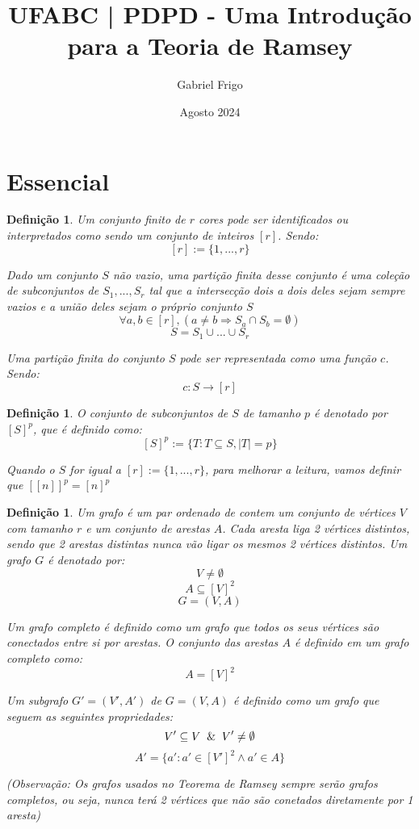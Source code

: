 \documentclass{article}
\title{UFABC | PDPD - Uma Introdução para a Teoria de Ramsey}
\author{Gabriel Frigo}
\date{Agosto 2024}
\newtheorem{defi}[teor]{Definição}
\begin{document}
\maketitle


\section{Essencial}


\begin{defi}
    \label{finite_partition_c}
    Um \emph{conjunto finito de $r$ cores} pode ser identificados ou interpretados como sendo um conjunto de inteiros $[r]$. Sendo:
    \[[r]:=\{1, ..., r\}\]

    Dado um conjunto $S$ não vazio, uma partição finita desse conjunto é uma coleção de subconjuntos de $S_1, ..., S_r$ tal que a intersecção dois a dois deles sejam sempre vazios e a união deles sejam o próprio conjunto $S$
    \[\forall{a,b} \in [r], (a \neq b \Rightarrow S_a \cap S_b = \emptyset)\]
    \[S = S_1 \cup ... \cup S_r \]

    Uma \emph{partição finita do conjunto $S$} pode ser representada como uma função $c$. Sendo:
    \[c:S\rightarrow[r]\]
\end{defi}

\begin{defi}
    \label{subset_p}
    O \emph{conjunto de subconjuntos de $S$ de tamanho $p$} é denotado por $[S]^p$, que é definido como:
    \[[S]^p:=\{T: T \subseteq S, |T| = p\}\]

    Quando o $S$ for igual a $[r]:=\{1, ..., r\}$, para melhorar a leitura, vamos definir que $[[n]]^p = [n]^p$
\end{defi}

\begin{defi}
    \label{graph_g}
    Um \emph{grafo} é um par ordenado de contem um conjunto de vértices $V$ com tamanho $r$ e um conjunto de arestas $A$. Cada aresta liga 2 vértices distintos, sendo que 2 arestas distintas nunca vão ligar os mesmos 2 vértices distintos. Um grafo $G$ é denotado por:
    \[V \neq \emptyset\]
    \[A \subseteq [V]^2\]
    \[G = (V, A)\]

    Um \emph{grafo completo} é definido como um grafo que todos os seus vértices são conectados entre si por arestas. O conjunto das arestas $A$ é definido em um grafo completo como:
    \[A = [V]^2\]

    Um \emph{subgrafo} $G' = (V', A')$ de $G = (V, A)$ é definido como um grafo que seguem as seguintes propriedades:
    \[V' \subseteq V \And V' \neq \emptyset\]
    \[A' = \{a': a' \in [V']^2 \wedge a' \in A\}\]

    (Observação: Os grafos usados no Teorema de Ramsey sempre serão grafos completos, ou seja, nunca terá 2 vértices que não são conetados diretamente por 1 aresta)
\end{defi}
\end{document}
